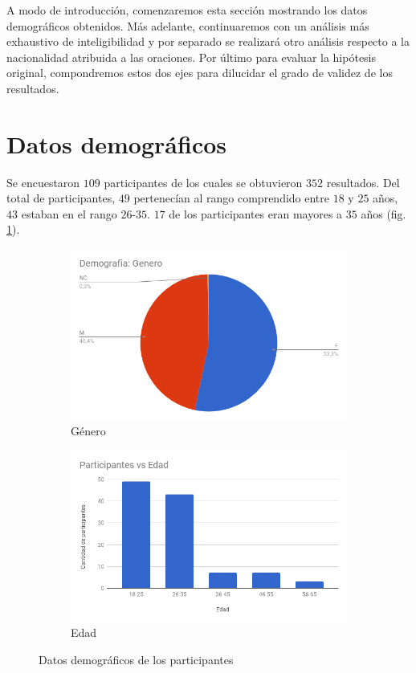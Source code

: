
A modo de introducción, comenzaremos esta sección mostrando los datos demográficos obtenidos. Más adelante, continuaremos con un análisis más exhaustivo de inteligibilidad y por separado se realizará otro análisis respecto a la nacionalidad atribuida a las oraciones. Por último para evaluar la hipótesis original, compondremos estos dos ejes para dilucidar el grado de validez de los resultados.

\section{Datos demográficos}

Se encuestaron $109$ participantes de los cuales se obtuvieron $352$ resultados. Del total de participantes, $49$ pertenecían al rango comprendido entre $18$ y $25$ años, $43$ estaban en el rango $26$-$35$. $17$ de los participantes eran mayores a $35$ años (fig. \ref{genero}).

\begin{figure}
\centering
\begin{subfigure}{.5\textwidth}
  \centering
	\includegraphics[width=1\linewidth]{datosDemograficos/genero.png}
  \caption{Género}
  \label{genero}
\end{subfigure}%
\begin{subfigure}{.5\textwidth}
  \centering
	\includegraphics[width=1\linewidth]{datosDemograficos/edad.png}
  \caption{Edad}
  \label{fig:sub2}
\end{subfigure}
\caption{Datos demográficos de los participantes}
\label{edad}
\end{figure}

